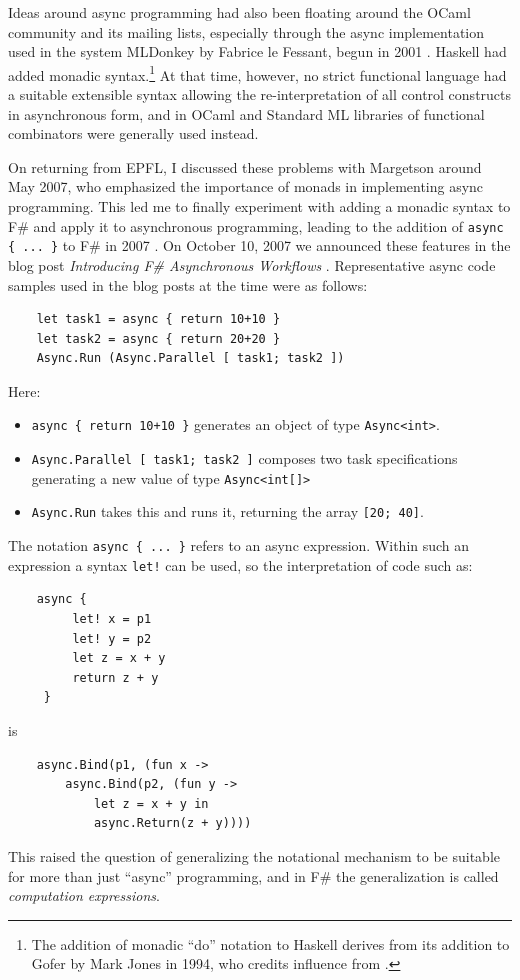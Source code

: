 \documentclass[acmsmall,screen]{acmart}
\begin{document}
Ideas around async programming had also been floating around the OCaml community and its mailing lists, especially through the async implementation used in the system MLDonkey by Fabrice le Fessant, begun in
2001 \citep{RefMLDonkey}.  Haskell had added monadic syntax.\footnote{The addition of  monadic “do” notation to Haskell derives from its addition to Gofer by Mark Jones in 1994, who credits influence from \citep{Launchbury93lazy}.} At that time, however,
no strict functional language had a suitable extensible syntax allowing the re-interpretation of all control constructs in asynchronous form, and in
OCaml and Standard ML libraries of functional combinators were generally used instead.  

On returning from EPFL, I discussed these problems with Margetson around May 2007, who emphasized the importance of monads in implementing async programming. This led me to finally experiment with adding a monadic syntax to F\# and apply it to asynchronous programming, leading to the addition of \texttt{async \{ ... \}} to F\# in 2007 \citep{Syme2011}.  On October 10, 2007 we announced these features in
the blog post \textit{Introducing F\# Asynchronous Workflows} \citep{RefAsyncWorkflowsBlog}. Representative async code samples used in the blog posts at the time were as follows:

\begin{verbatim}
    let task1 = async { return 10+10 }
    let task2 = async { return 20+20 }
    Async.Run (Async.Parallel [ task1; task2 ])
\end{verbatim}

Here:
\begin{itemize}
\item \texttt{async \{ return 10+10 \}} generates an object of type \texttt{Async<int>}.  
\item \texttt{Async.Parallel [ task1; task2 ]} composes two task specifications generating a new value of type \texttt{Async<int[]>}
\item \texttt{Async.Run} takes this and runs it, returning the array \texttt{[20; 40]}. 
\end{itemize}

The notation \texttt{async \{ ... \}} refers to an async expression. Within such an expression a syntax \texttt{let!} can be used, so the interpretation of code such as:
\begin{verbatim}
    async { 
         let! x = p1 
         let! y = p2
         let z = x + y
         return z + y 
     }
\end{verbatim}
is
\begin{verbatim}
    async.Bind(p1, (fun x -> 
        async.Bind(p2, (fun y -> 
            let z = x + y in
            async.Return(z + y))))
\end{verbatim}
This raised the question of generalizing the notational mechanism to be suitable for more than just ``async'' programming, and in F\# the 
generalization is called \emph{computation expressions}.
\end{document}
